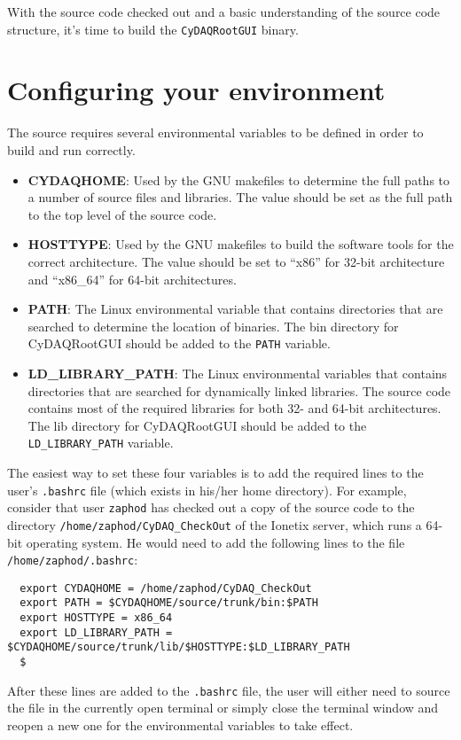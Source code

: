 With the \ADAQ source code checked out and a basic understanding of the
source code structure, it's time to build the \texttt{CyDAQRootGUI}
binary.

    
\section{Configuring your environment}
\label{sec:config}
The \ADAQ source requires several environmental variables to be defined
in order to build and run correctly.
\begin{itemize}
\item{\textbf{CYDAQHOME}: Used by the \ADAQ GNU makefiles to determine
    the full paths to a number of source files and libraries. The
    value should be set as the full path to the top level of the \ADAQ
    source code.}
\item{\textbf{HOSTTYPE}: Used by the \ADAQ GNU makefiles to build the
    \ADAQ software tools for the correct architecture. The value should
    be set to ``x86'' for 32-bit architecture and ``x86\_64'' for
    64-bit architectures.}
\item{\textbf{PATH}: The Linux environmental variable that contains
    directories that are searched to determine the location of
    binaries. The bin directory for CyDAQRootGUI should be added to
    the \texttt{PATH} variable.}
\item{\textbf{LD\_LIBRARY\_PATH}: The Linux environmental variables that
    contains directories that are searched for dynamically linked
    libraries. The \ADAQ source code contains most of the required
    libraries for both 32- and 64-bit architectures. The lib directory
    for CyDAQRootGUI should be added to the \texttt{LD\_LIBRARY\_PATH}
    variable.}
\end{itemize}

The easiest way to set these four variables is to add the required
lines to the user's \texttt{.bashrc} file (which exists in his/her
home directory). For example, consider that user \texttt{zaphod} has
checked out a copy of the \ADAQ source code to the directory
\texttt{/home/zaphod/CyDAQ\_CheckOut} of the Ionetix server, which runs
a 64-bit operating system. He would need to add the following lines to
the file \texttt{/home/zaphod/.bashrc}:
\begin{lstlisting}
  export CYDAQHOME = /home/zaphod/CyDAQ_CheckOut
  export PATH = $CYDAQHOME/source/trunk/bin:$PATH
  export HOSTTYPE = x86_64
  export LD_LIBRARY_PATH = $CYDAQHOME/source/trunk/lib/$HOSTTYPE:$LD_LIBRARY_PATH
  $
\end{lstlisting}
\noindent
After these lines are added to the \texttt{.bashrc} file, the user
will either need to source the file in the currently open terminal or
simply close the terminal window and reopen a new one for the
environmental variables to take effect.

